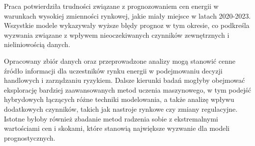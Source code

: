 Praca potwierdziła trudności związane z prognozowaniem cen energii w warunkach wysokiej zmienności rynkowej, jakie miały miejsce w latach 2020-2023. Wszystkie modele wykazywały wyższe błędy prognoz w tym okresie, co podkreśla wyzwania związane z wpływem nieoczekiwanych czynników zewnętrznych i nieliniowością danych.

Opracowany zbiór danych oraz przeprowadzone analizy mogą stanowić cenne źródło informacji dla uczestników rynku energii w podejmowaniu decyzji handlowych i zarządzaniu ryzykiem. Dalsze kierunki badań mogłyby obejmować eksplorację bardziej zaawansowanych metod uczenia maszynowego, w tym podejść hybrydowych łączących różne techniki modelowania, a także analizę wpływu dodatkowych czynników, takich jak nastroje rynkowe czy zmiany regulacyjne. Istotne byłoby również zbadanie metod radzenia sobie z ekstremalnymi wartościami cen i skokami, które stanowią największe wyzwanie dla modeli prognostycznych.
